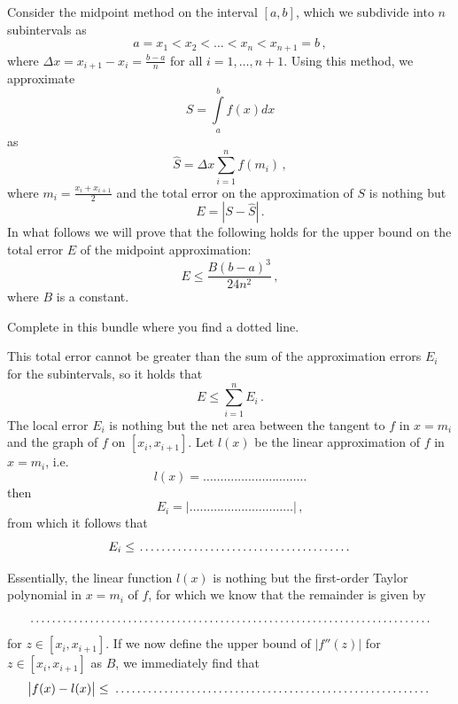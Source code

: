 \begin{Exercise}
Consider the midpoint method on the interval $[a,b]$, which we subdivide into $n$ subintervals as
$$
a=x_1<x_2<\ldots<x_n<x_{n+1}=b\,,
$$
where $\Delta x=x_{i+1}-x_i=\frac{b-a}{n}$ for all $i=1,\ldots,n+1$. Using this method, we approximate
$$
S=\int\limits_a^bf(x)dx
$$
as
$$
\hat{S}=\Delta x\sum_{i=1}^nf(m_i)\,,
$$
where $m_i=\frac{x_i+x_{i+1}}{2}$ and the total error on the approximation of $S$ is nothing but
$$
E=\left|S-\hat{S}\right|\,.
$$
In what follows we will prove that the following holds for the upper bound on the total error $E$ of the midpoint approximation:
$$
E\leq \dfrac{B(b-a)^3}{24n^2}\,,
$$ 
where $B$ is a constant. 

Complete in this bundle where you find a dotted line.

This total error cannot be greater than the sum of the approximation errors $E_i$ for the subintervals, so it holds that
\vspace*{1cm}
$$
E\leq \sum_{i=1}^nE_i\,.
$$
The local error $E_i$ is nothing but the net area between the tangent to $f$ in $x=m_i$ and the graph of $f$ on $[x_i,x_{i+1}]$. Let $l(x)$ be the linear approximation of $f$ in $x=m_i$, i.e.
\vspace*{1cm}
$$
l(x)=\ldots\ldots\ldots\ldots\ldots\ldots\ldots\ldots\ldots\ldots%
$$
then
\vspace*{1cm}
$$
E_i=\Bigg|\ldots\ldots\ldots\ldots\ldots\ldots\ldots\ldots\ldots\ldots\Bigg|\,,
$$
from which it follows that
\vspace*{1cm}
\begin{equation}
E_i\leq\dotrule{0.5\textwidth}
\label{midpoint1}
\end{equation}
\vspace*{0.5cm}

Essentially, the linear function $l(x)$ is nothing but the first-order Taylor polynomial in $x=m_i$ of $f$, for which we know that the remainder is given by 
\vspace*{1cm}
$$
\dotrule{0.95\textwidth}%
$$
for $z\in[x_i,x_{i+1}]$. If we now define the upper bound of $\left|f''(z)\right|$ for $z\in[x_i,x_{i+1}]$ as $B$, we immediately find that
\vspace*{1cm}
$$
\left|f(x)-l(x)\right|\leq\dotrule{0.75\textwidth}%
$$
\vspace*{0.5cm}


\end{Exercise}

